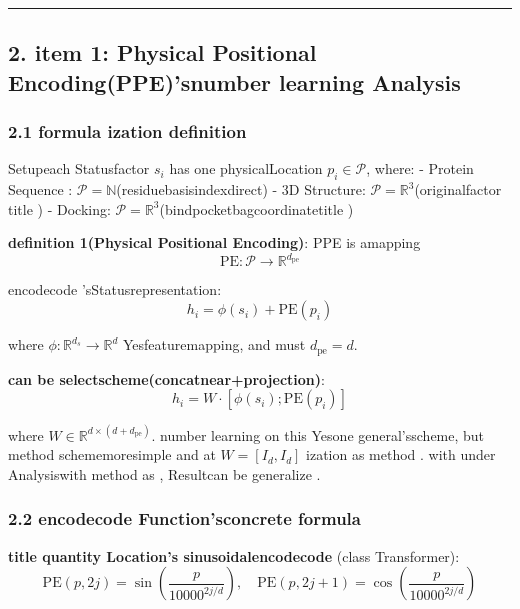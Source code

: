 \documentclass[
  12pt,
]{article}
\begin{document}
\begin{center}\rule{0.5\linewidth}{0.5pt}\end{center}

\subsection{2. item  1: Physical Positional
Encoding(PPE)'snumber learning Analysis}\label{ux7ec4ux4ef6-1physical-positional-encodingppeux7684ux6570ux5b66ux5206ux6790}

\subsubsection{2.1 formula ization definition }\label{ux5f62ux5f0fux5316ux5b9aux4e49}

Setupeach Statusfactor  \(s_i\) has one physicalLocation \(p_i \in \mathcal{P}\), where: 
- Protein Sequence : \(\mathcal{P} = \mathbb{N}\)(residuebasisindexdirect) - 3D
Structure: \(\mathcal{P} = \mathbb{R}^3\)(originalfactor title ) -
Docking: \(\mathcal{P} = \mathbb{R}^3\)(bindpocketbagcoordinatetitle )

\textbf{definition  1(Physical Positional Encoding)}: PPE is amapping
\[\text{PE}: \mathcal{P} \to \mathbb{R}^{d_{\text{pe}}}\]

encodecode 'sStatusrepresentation:  \[\boxed{h_i = \phi(s_i) + \text{PE}(p_i)}\]

where \(\phi: \mathbb{R}^{d_s} \to \mathbb{R}^{d}\)
Yesfeaturemapping, and must  \(d_{\text{pe}} = d\). 

\textbf{can be selectscheme(concatnear+projection)}: 
\[h_i = W \cdot [\phi(s_i); \text{PE}(p_i)]\]

where
\(W \in \mathbb{R}^{d \times (d + d_{\text{pe}})}\). number learning on this Yesone general'sscheme, but method schememoresimple and at 
\(W = [I_d, I_d]\) ization as method . with under Analysiswith method as , Resultcan be generalize . 

\subsubsection{2.2
encodecode Function'sconcrete formula }\label{ux7f16ux7801ux51fdux6570ux7684ux5177ux4f53ux5f62ux5f0f}

\textbf{title quantity Location's sinusoidalencodecode }(class  Transformer):
\[\text{PE}(p, 2j) = \sin\left(\frac{p}{10000^{2j/d}}\right), \quad \text{PE}(p, 2j+1) = \cos\left(\frac{p}{10000^{2j/d}}\right)\]
\end{document}
